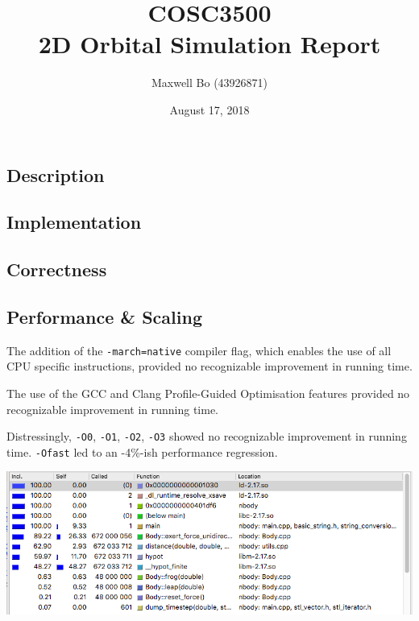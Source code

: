 \documentclass[11pt,a4paper]{article}
\begin{document}
\title{COSC3500 \\ 2D Orbital Simulation Report}
\author{Maxwell Bo (43926871)}
\date{August 17, 2018}
\maketitle

\subsection*{Description}

\subsection*{Implementation}

\subsection*{Correctness}

\subsection*{Performance \& Scaling}

The addition of the 
\texttt{-march=native} compiler flag, which enables the use of all CPU specific instructions, provided no recognizable improvement in running time.

The use of the GCC and Clang Profile-Guided Optimisation features provided no recognizable improvement in running time.

Distressingly, \texttt{-O0}, \texttt{-O1}, \texttt{-O2}, \texttt{-O3} showed no recognizable improvement in running time. \texttt{-Ofast} led to an -4\%-ish performance regression.


\includegraphics[width=\textwidth]{profile}
\end{document}
